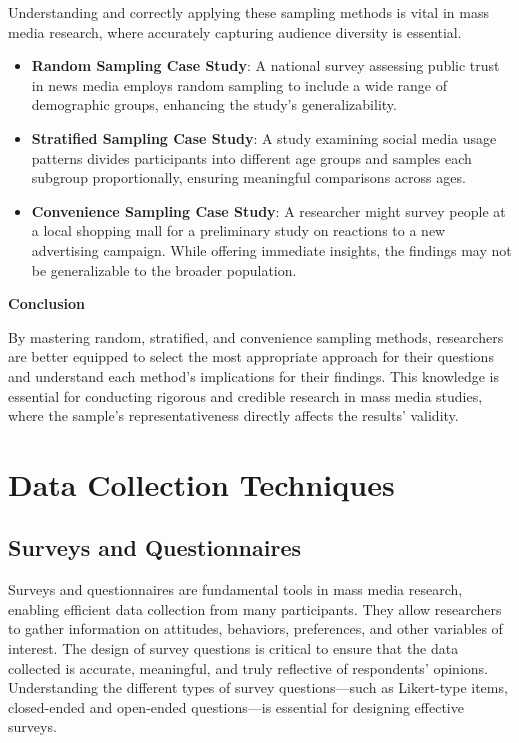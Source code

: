 \documentclass[
]{book}
\begin{document}
Understanding and correctly applying these sampling methods is vital in mass media research, where accurately capturing audience diversity is essential.

\begin{itemize}
\item
  \textbf{Random Sampling Case Study}: A national survey assessing public trust in news media employs random sampling to include a wide range of demographic groups, enhancing the study's generalizability.
\item
  \textbf{Stratified Sampling Case Study}: A study examining social media usage patterns divides participants into different age groups and samples each subgroup proportionally, ensuring meaningful comparisons across ages.
\item
  \textbf{Convenience Sampling Case Study}: A researcher might survey people at a local shopping mall for a preliminary study on reactions to a new advertising campaign. While offering immediate insights, the findings may not be generalizable to the broader population.
\end{itemize}

\textbf{Conclusion}

By mastering random, stratified, and convenience sampling methods, researchers are better equipped to select the most appropriate approach for their questions and understand each method's implications for their findings. This knowledge is essential for conducting rigorous and credible research in mass media studies, where the sample's representativeness directly affects the results' validity.

\section{Data Collection Techniques}\label{data-collection-techniques}

\subsection*{Surveys and Questionnaires}\label{surveys-and-questionnaires}

Surveys and questionnaires are fundamental tools in mass media research, enabling efficient data collection from many participants. They allow researchers to gather information on attitudes, behaviors, preferences, and other variables of interest. The design of survey questions is critical to ensure that the data collected is accurate, meaningful, and truly reflective of respondents' opinions. Understanding the different types of survey questions---such as Likert-type items, closed-ended and open-ended questions---is essential for designing effective surveys.
\end{document}
